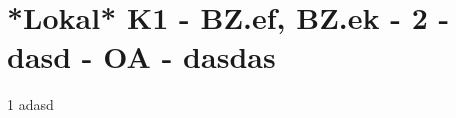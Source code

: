 \section{*Lokal* K1 - BZ.ef, BZ.ek - 2 - dasd - OA - dasdas}

\begin{langesbeispiel}\item[1] %
adasd

\end{langesbeispiel}